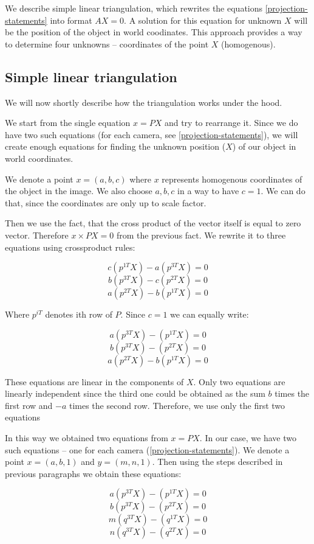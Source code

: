 We describe simple linear triangulation, which rewrites the equations
\ref{projection-statements} into format $AX = 0$. A solution for this equation
for unknown $X$ will be the position of the object in world coodinates. This
approach provides a way to determine four unknowns -- coordinates
of the point $X$ (homogenous).


\subsection{Simple linear triangulation}

We will now shortly describe how the triangulation works under the hood.

We start from the single equation $x = PX$ and try to rearrange it. Since we do
have two such equations (for each camera, see \ref{projection-statements}), we
will create enough equations for finding the unknown position ($X$) of our
object in world coordinates.

We denote a point $x=(a, b, c)$ where $x$ represents homogenous coordinates of
the object in the image. We also choose $a, b, c$ in a way to have $c = 1$. We
can do that, since the coordinates are only up to scale factor.

Then we use the fact, that the cross product of the vector itself is equal to
zero vector. Therefore $x \times PX = 0$ from the previous fact. We rewrite it
to three equations using crossproduct rules:

$$ c(p^{1T}X) - a(p^{3T}X) = 0 $$
$$ b(p^{3T}X) - c(p^{2T}X) = 0 $$
$$ a(p^{2T}X) - b(p^{1T}X) = 0 $$

Where $p^{iT}$ denotes ith row of $P$. Since $c = 1$ we can equally write:

$$ a(p^{3T}X) - (p^{1T}X) = 0 $$
$$ b(p^{3T}X) - (p^{2T}X) = 0 $$
$$ a(p^{2T}X) - b(p^{1T}X) = 0 $$

These equations are linear in the components of $X$. Only two equations are
linearly independent since the third one could be obtained as the sum $b$ times
the first row and $-a$ times the second row. Therefore, we use only the first
two equations

In this way we obtained two equations from $x = PX$. In our case, we have
two such equations -- one for each camera (\ref{projection-statements}). We
denote a point $x = (a, b, 1)$ and $y=(m, n, 1)$. Then using the steps described in previous paragraphs we obtain these equations:

$$ a(p^{3T}X) - (p^{1T}X) = 0 $$
$$ b(p^{3T}X) - (p^{2T}X) = 0 $$
$$ m(q^{3T}X) - (q^{1T}X) = 0 $$
$$ n(q^{3T}X) - (q^{2T}X) = 0 $$

